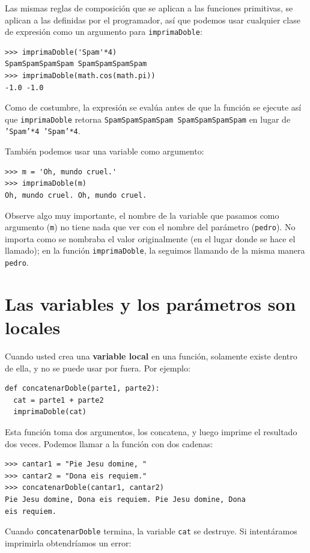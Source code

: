 Las mismas reglas de composición que se aplican a las funciones primitivas,
se aplican a las definidas por el programador, así que podemos usar
cualquier clase de expresión como un argumento para \texttt{imprimaDoble}:

\begin{lstlisting}
>>> imprimaDoble('Spam'*4)
SpamSpamSpamSpam SpamSpamSpamSpam
>>> imprimaDoble(math.cos(math.pi))
-1.0 -1.0
\end{lstlisting}
 Como de costumbre, la expresión se evalúa antes de que la función
se ejecute así que \texttt{imprimaDoble} retorna \texttt{SpamSpamSpamSpam
SpamSpamSpamSpam} en lugar de \texttt{'Spam'{*}4 'Spam'{*}4}.

También podemos usar una variable como argumento:

\begin{lstlisting}
>>> m = 'Oh, mundo cruel.'
>>> imprimaDoble(m)
Oh, mundo cruel. Oh, mundo cruel.
\end{lstlisting}
 Observe algo muy importante, el nombre de la variable que pasamos
como argumento (\texttt{m}) no tiene nada que ver con el nombre del
parámetro (\texttt{pedro}). No importa como se nombraba el valor originalmente
(en el lugar donde se hace el llamado); en la función \texttt{imprimaDoble},
la seguimos llamando de la misma manera \texttt{pedro}.

\section{Las variables y los parámetros son locales}

 

Cuando usted crea una \textbf{variable local} en una función, solamente
existe dentro de ella, y no se puede usar por fuera. Por ejemplo:

\begin{lstlisting}
def concatenarDoble(parte1, parte2):
  cat = parte1 + parte2
  imprimaDoble(cat)
\end{lstlisting}
 Esta función toma dos argumentos, los concatena, y luego imprime
el resultado dos veces. Podemos llamar a la función con dos cadenas:

\begin{lstlisting}
>>> cantar1 = "Pie Jesu domine, "
>>> cantar2 = "Dona eis requiem."
>>> concatenarDoble(cantar1, cantar2)
Pie Jesu domine, Dona eis requiem. Pie Jesu domine, Dona 
eis requiem.
\end{lstlisting}
Cuando \texttt{concatenarDoble} termina, la variable \texttt{cat}
se destruye. Si intentáramos imprimirla obtendríamos un error:

